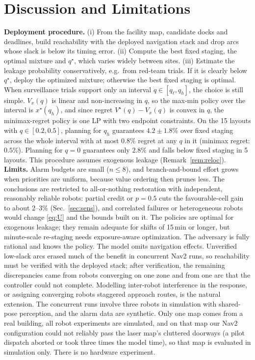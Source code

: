 \documentclass[letterpaper,journal]{IEEEtran}
\theoremstyle{remark}
\begin{document}
\section{Discussion and Limitations}
\textbf{Deployment procedure.} (i) From the facility map, candidate docks and deadlines, build reachability with the deployed navigation stack and drop arcs whose slack is below its timing error. (ii) Compute the best fixed staging, the optimal mixture and $q^\star$, which varies widely between sites. (iii) Estimate the leakage probability conservatively, e.g.\ from red-team trials. If it is clearly below $q^\star$, deploy the optimized mixture; otherwise the best fixed staging is optimal. When surveillance trials support only an interval $q\in[q_\ell,q_h]$, the choice is still simple. $V_x(q)$ is linear and non-increasing in $q$, so the max-min policy over the interval is $x^\star(q_h)$, and since regret $V^\star(q)-V_x(q)$ is convex in $q$, the minimax-regret policy is one LP with two endpoint constraints. On the 15 layouts with $q\in[0.2,0.5]$, planning for $q_h$ guarantees $4.2\pm1.8\%$ over fixed staging across the whole interval with at most $0.8\%$ regret at any $q$ in it (minimax regret: $0.5\%$). Planning for $q=0$ guarantees only $2.8\%$ and falls below fixed staging in 5 layouts. This procedure assumes exogenous leakage (Remark~\ref{rem:reloc}). \textbf{Limits.} Alarm budgets are small ($n\le8$), and branch-and-bound effort grows when priorities are uniform, because value ordering then prunes less. The conclusions are restricted to all-or-nothing restoration with independent, reasonably reliable robots: partial credit or $p=0.5$ cuts the favourable-cell gain to about 2--3\% (Sec.~\ref{sec:sens}), and correlated failures or heterogeneous robots would change \eqref{eq:U} and the bounds built on it. The policies are optimal for exogenous leakage; they remain adequate for shifts of 15\,min or longer, but minute-scale re-staging needs exposure-aware optimization. The adversary is fully rational and knows the policy. The model omits navigation effects. Unverified low-slack arcs erased much of the benefit in concurrent Nav2 runs, so reachability must be verified with the deployed stack; after verification, the remaining discrepancies came from robots converging on one zone and from one arc that the controller could not complete. Modelling inter-robot interference in the response, or assigning converging robots staggered approach routes, is the natural extension. The concurrent runs involve three robots in simulation with shared-pose perception, and the alarm data are synthetic. Only one map comes from a real building, all robot experiments are simulated, and on that map our Nav2 configuration could not reliably pass the laser map's cluttered doorways (a pilot dispatch aborted or took three times the model time), so that map is evaluated in simulation only. There is no hardware experiment.
\end{document}
